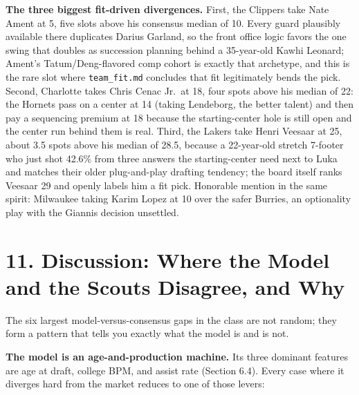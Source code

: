 \documentclass[
  10pt,
]{article}
\begin{document}
\textbf{The three biggest fit-driven divergences.} First, the Clippers take Nate
Ament at 5, five slots above his consensus median of 10. Every guard plausibly
available there duplicates Darius Garland, so the front office logic favors the
one swing that doubles as succession planning behind a 35-year-old Kawhi
Leonard; Ament's Tatum/Deng-flavored comp cohort is exactly that archetype, and
this is the rare slot where \texttt{team\_fit.md} concludes that fit
legitimately bends the pick. Second, Charlotte takes Chris Cenac Jr.~at 18, four
spots above his median of 22: the Hornets pass on a center at 14 (taking
Lendeborg, the better talent) and then pay a sequencing premium at 18 because
the starting-center hole is still open and the center run behind them is real.
Third, the Lakers take Henri Veesaar at 25, about 3.5 spots above his median of
28.5, because a 22-year-old stretch 7-footer who just shot 42.6\% from three
answers the starting-center need next to Luka and matches their older
plug-and-play drafting tendency; the board itself ranks Veesaar 29 and openly
labels him a fit pick. Honorable mention in the same spirit: Milwaukee taking
Karim Lopez at 10 over the safer Burries, an optionality play with the Giannis
decision unsettled.

\section{11. Discussion: Where the Model and the Scouts Disagree, and
Why}\label{discussion-where-the-model-and-the-scouts-disagree-and-why}

The six largest model-versus-consensus gaps in the class are not random; they
form a pattern that tells you exactly what the model is and is not.

\textbf{The model is an age-and-production machine.} Its three dominant features
are age at draft, college BPM, and assist rate (Section 6.4). Every case where
it diverges hard from the market reduces to one of those levers:
\end{document}
